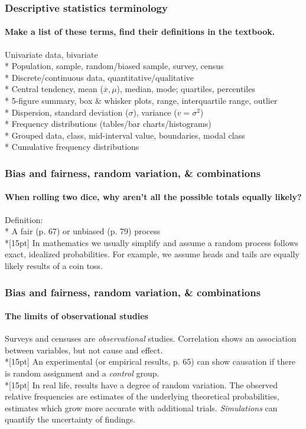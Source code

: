 \documentclass{beamer}
\begin{document}
\frame
{
  \frametitle{Descriptive statistics terminology}
  \framesubtitle{Make a list of these terms, find their definitions in the textbook.}

  Univariate data, bivariate\\*
  Population, sample, random/biased sample, survey, census\\*
  Discrete/continuous data, quantitative/qualitative\\*
  Central tendency, mean ($\overline{x}, \mu$), median, mode; quartiles, percentiles\\*
  5-figure summary, box \& whisker plots, range, interquartile range, outlier\\*
  Dispersion, standard deviation ($\sigma$), variance ($v=\sigma^2$)\\*
  Frequency distributions (tables/bar charts/histograms)\\*
  Grouped data, class, mid-interval value, boundaries, modal class\\*
  Cumulative frequency distributions


}

\frame
{
  \frametitle{Bias and fairness, random variation, \& combinations}
  \framesubtitle{When rolling two dice, why aren't all the possible totals equally likely?}
  Definition:\\*
  A \alert{fair} (p. 67) or \alert{unbiased} (p. 79) process \\*[15pt]
  In mathematics we usually simplify and assume a random process follows exact, idealized probabilities. For example, we assume heads and tails are equally likely results of a coin toss.

}

\frame
{
  \frametitle{Bias and fairness, random variation, \& combinations}
  \framesubtitle{The limits of observational studies}
  Surveys and censuses are \emph{observational} studies. Correlation shows an association between variables, but not cause and effect.\\*[15pt]
  An \alert{experimental} (or \alert{empirical} results, p. 65) can show causation if there is random assignment and a \emph{control} group.\\*[15pt]
  In real life,  results have a degree of \alert{random variation}. The observed relative frequencies are estimates of the underlying theoretical probabilities, estimates which grow more accurate with additional trials. \emph{Simulations} can quantify the uncertainty of findings.

}
\end{document}
